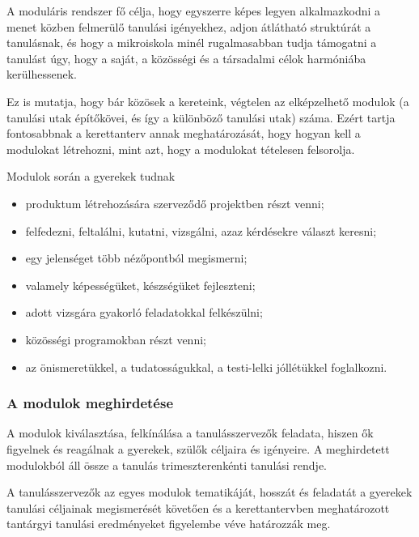 A moduláris rendszer fő célja, hogy egyszerre képes legyen
alkalmazkodni a menet közben felmerülő tanulási igényekhez, adjon
átlátható\linebreak
struktúrát a tanulásnak, és hogy a mikroiskola minél rugalmasabban tudja támogatni a tanulást úgy, hogy a saját, a közösségi és a társadalmi célok harmóniába kerülhessenek.

Ez is mutatja, hogy bár közösek a kereteink, végtelen az elképzelhető modulok (a tanulási utak építőkövei, és így a különböző tanulási utak) száma. Ezért tartja fontosabbnak a kerettanterv annak meghatározását, hogy hogyan kell a modulokat létrehozni, mint azt, hogy a modulokat tételesen felsorolja.

Modulok során a gyerekek tudnak

\begin{itemize}
      \item produktum létrehozására szerveződő projektben részt venni;

      \item felfedezni, feltalálni, kutatni, vizsgálni, azaz kérdésekre választ keresni;

      \item egy jelenséget több nézőpontból megismerni;

      \item valamely képességüket, készségüket fejleszteni;

      \item adott vizsgára gyakorló feladatokkal felkészülni;

      \item közösségi programokban részt venni;

      \item az önismeretükkel, a tudatosságukkal, a testi-lelki jóllétükkel fog\-lal\-kozni.
\end{itemize}

\subsubsection{A modulok meghirdetése}
\label{sec:modulok_meghirdetese}
A modulok kiválasztása, felkínálása a tanulásszervezők feladata, hiszen ők figyelnek és reagálnak a gyerekek, szülők céljaira és igényeire. A meghirdetett modulokból áll össze a tanulás trimeszterenkénti tanulási rendje.

A tanulásszervezők az egyes modulok tematikáját, hosszát és feladatát a gyerekek tanulási céljainak megismerését követően és a kerettantervben meghatározott tantárgyi tanulási eredményeket figyelembe véve határozzák meg.


